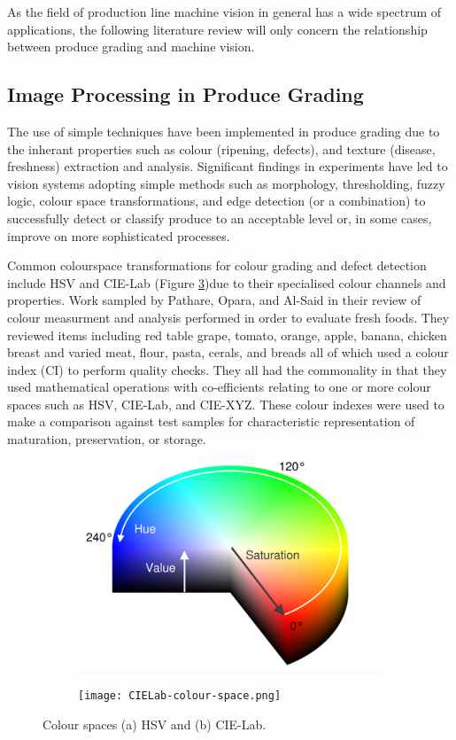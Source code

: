 \documentclass[fleqn,twoside]{article}
\begin{document}
As the field of production line machine vision in general has a wide spectrum of applications, the following literature review will only concern the relationship between produce grading and machine vision. 


\subsection{Image Processing in Produce Grading}

 
The use of simple techniques have been implemented in produce grading due to the inherant properties such as colour (ripening, defects), and texture (disease, freshness) extraction and analysis. Significant findings in experiments have led to vision systems adopting simple methods such as morphology, thresholding, fuzzy logic, colour space transformations, and edge detection (or a combination) to successfully detect or classify produce to an acceptable level or, in some cases, improve on more sophisticated processes.

Common colourspace transformations for colour grading and defect detection include HSV and CIE-Lab (Figure \ref{fig:colour-space})due to their specialised colour channels and properties. Work sampled by Pathare, Opara, and Al-Said \cite{pathare} in their review of colour measurment and analysis performed in order to evaluate fresh foods. They reviewed items including red table grape, tomato, orange, apple, banana, chicken breast and varied meat, flour, pasta, cerals, and breads all of which used a colour index (CI) to perform quality checks. They all had the commonality in that they used mathematical operations with co-efficients relating to one or more colour spaces such as HSV, CIE-Lab, and CIE-XYZ. These colour indexes were used to make a comparison against test samples for characteristic representation of maturation, preservation, or storage. 

\begin{figure}[h]
	\centering
	\begin{subfigure}{.5\textwidth}
		\centering
		\includegraphics[width=.7\linewidth]{hue_sat.png}
		\caption{}
		\label{fig:HSV}
	\end{subfigure}%
	\begin{subfigure}{.5\textwidth}
		\centering
		\texttt{[image: CIELab-colour-space.png]}
		\caption{}
		\label{fig:Lab}
	\end{subfigure}%
	\caption{Colour spaces (a) HSV and (b) CIE-Lab.}
	\label{fig:colour-space}
\end{figure}
\end{document}
